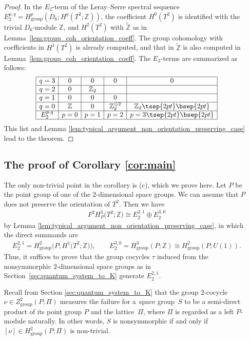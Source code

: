 \documentclass[pdftex]{sigma}
\theoremstyle{definition}
\newcommand{\Z}{\mathbb{Z}}
\begin{document}
\begin{proof} In the $E_2$-term of the Leray--Serre spectral sequence $E_2^{p, q} = H^p_{\mathrm{group}}(D_6; H^q(T^2; \Z))$, the coef\/f\/icient $H^0(T^2)$ is identif\/ied with the trivial $D_6$-module $\Z$, and $H^2(T^2)$ with $\tilde{\Z}$ as in Lemma~\ref{lem:group_coh_orientation_coeff}. The group cohomology with coef\/f\/icients in $H^1(T^2)$ is already computed, and that in $\tilde{\Z}$ is also computed in Lemma~\ref{lem:group_coh_orientation_coeff}. The $E_2$-terms are summarized as follows:
$$
\begin{array}{|c|c|c|c|c|}
\hline
q = 3 & 0 & 0 & 0 & 0 \\
\hline
q = 2 & 0 & \Z_2 & & \\
\hline
q = 1 & 0 & 0 & 0 & \\
\hline
q = 0 & \Z & 0 & \Z_2^{\oplus 2} & \Z_2 \tsep{2pt}\bsep{2pt}\\
\hline
E_2^{p, q} & p = 0 & p = 1 & p = 2 & p = 3 \tsep{2pt}\bsep{2pt}\\
\hline
\end{array}
$$
This list and Lemma \ref{lem:typical_argument_non_orientation_preserving_case} lead to the theorem.
\end{proof}

\subsection{The proof of Corollary \ref{cor:main}}

The only non-trivial point in the corollary is (c), which we prove here. Let $P$ be the point group of one of the $2$-dimensional space groups. We can assume that $P$ does not preserve the orientation of $T^2$. Then we have
\begin{gather*}
F^2H^3_P\big(T^2; \Z\big) \cong E^{2,1}_2 \oplus E^{3, 0}_2
\end{gather*}
by Lemma \ref{lem:typical_argument_non_orientation_preserving_case}, in which the direct summands are
\begin{gather*}
E^{2, 1}_2 = H^2_{\mathrm{group}}\big(P; H^1\big(T^2; \Z\big)\big), \qquad
E^{3, 0}_2 = H^3_{\mathrm{group}}(P; \Z) \cong H^2_{\mathrm{group}}(P; U(1)).
\end{gather*}
Thus, it suf\/f\/ices to prove that the group cocycles $\tau$ induced from the nonsymmorphic $2$-dimensional space groups as in Section~\ref{sec:quantum_system_to_K} generate $E^{2, 1}_2$.

Recall from Section \ref{sec:quantum_system_to_K} that the group $2$-cocycle $\nu \in Z^2_{\mathrm{group}}(P; \Pi)$ measures the failure for a~space group~$S$ to be a semi-direct product of its point group $P$ and the lattice~$\Pi$, where $\Pi$ is regarded as a left $P$-module naturally. In other words, $S$ is nonsymmorphic if and only if $[\nu] \in H^2_{\mathrm{group}}(P; \Pi)$ is non-trivial.
\end{document}
